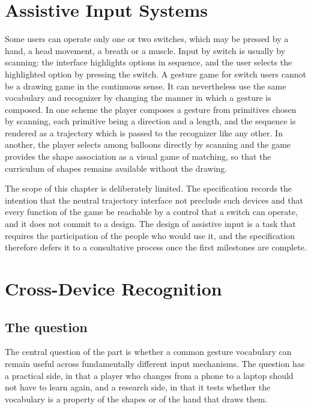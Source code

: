 \chapter{Assistive Input Systems}\label{ch:assistive}

Some users can operate only one or two switches, which may be pressed by a hand, a head movement, a breath or a muscle. Input by switch is usually by scanning: the interface highlights options in sequence, and the user selects the highlighted option by pressing the switch. A gesture game for switch users cannot be a drawing game in the continuous sense. It can nevertheless use the same vocabulary and recognizer by changing the manner in which a gesture is composed. In one scheme the player composes a gesture from primitives chosen by scanning, each primitive being a direction and a length, and the sequence is rendered as a trajectory which is passed to the recognizer like any other. In another, the player selects among balloons directly by scanning and the game provides the shape association as a visual game of matching, so that the curriculum of shapes remains available without the drawing.

The scope of this chapter is deliberately limited. The specification records the intention that the neutral trajectory interface not preclude such devices and that every function of the game be reachable by a control that a switch can operate, and it does not commit to a design. The design of assistive input is a task that requires the participation of the people who would use it, and the specification therefore defers it to a consultative process once the first milestones are complete.\evS

\chapter{Cross-Device Recognition}\label{ch:cross-device}

\section{The question}

The central question of the part is whether a common gesture vocabulary can remain useful across fundamentally different input mechanisms. The question has a practical side, in that a player who changes from a phone to a laptop should not have to learn again, and a research side, in that it tests whether the vocabulary is a property of the shapes or of the hand that draws them.

